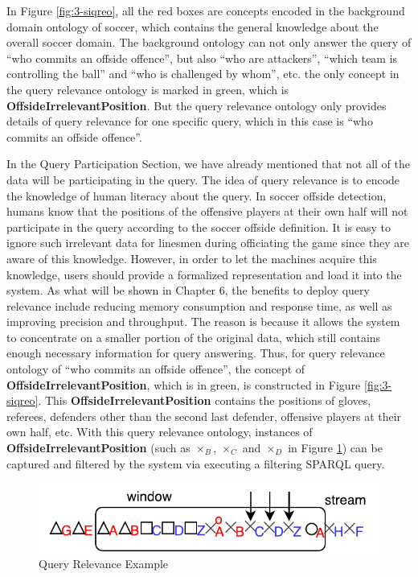 In Figure \ref{fig:3-siqreo}, all the red boxes are concepts encoded in the background domain ontology of soccer, which contains the general knowledge about the overall soccer domain. 
The background ontology can not only answer the query of ``who commits an offside offence'', but also ``who are attackers'', ``which team is controlling the ball'' and ``who is challenged by whom'', etc. 
the only concept in the query relevance ontology is marked in green, which is \textbf{OffsideIrrelevantPosition}. 
But the query relevance ontology only provides details of query relevance for one specific query, which in this case is ``who commits an offside offence''. 

In the Query Participation Section, we have already mentioned that not all of the data will be participating in the query.
The idea of query relevance is to encode the knowledge of human literacy about the query. 
In soccer offside detection, humans know that the positions of the offensive players at their own half will not participate in the query according to the soccer offside definition. 
It is easy to ignore such irrelevant data for linesmen during officiating the game since they are aware of this knowledge. 
However, in order to let the machines acquire this knowledge, users should provide a formalized representation and load it into the system. 
As what will be shown in Chapter 6, the benefits to deploy query relevance include reducing memory consumption and response time, as well as improving precision and throughput. 
The reason is because it allows the system to concentrate on a smaller portion of the original data, which still contains enough necessary information for query answering. 
Thus, for query relevance ontology of ``who commits an offside offence'', the concept of \textbf{OffsideIrrelevantPosition}, which is in green, is constructed in Figure \ref{fig:3-siqreo}. 
This \textbf{OffsideIrrelevantPosition} contains the positions of gloves, referees, defenders other than the second last defender, offensive players at their own half, etc. 
With this query relevance ontology, instances of \textbf{OffsideIrrelevantPosition} (such as  $\times_{B}$, $\times_{C}$ and $\times_{D}$ in Figure \ref{fig:3-siqre}) can be captured and filtered by the system via executing a filtering SPARQL query. 

\begin{figure}[!htbp]
	\centering
    \includegraphics[width=5in]{img/3-siqre.pdf}
    \caption{Query Relevance Example}
    \label{fig:3-siqre}
\end{figure}

